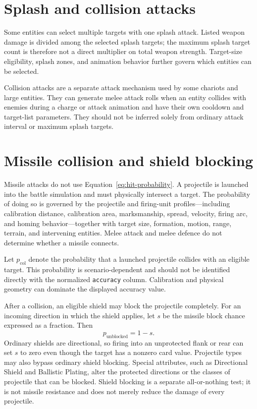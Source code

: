 \documentclass[11pt]{article}
\begin{document}
\section{Splash and collision attacks}

Some entities can select multiple targets with one splash attack.  Listed
weapon damage is divided among the selected splash targets; the maximum splash
target count is therefore not a direct multiplier on total weapon strength.
Target-size eligibility, splash zones, and animation behavior further govern
which entities can be selected.

Collision attacks are a separate attack mechanism used by some chariots and
large entities.  They can generate melee attack rolls when an entity collides
with enemies during a charge or attack animation and have their own cooldown
and target-list parameters.  They should not be inferred solely from ordinary
attack interval or maximum splash targets.

\section{Missile collision and shield blocking}

Missile attacks do not use Equation~\ref{eq:hit-probability}.  A projectile is
launched into the battle simulation and must physically intersect a target.
The probability of doing so is governed by the projectile and firing-unit
profiles---including calibration distance, calibration area, marksmanship,
spread, velocity, firing arc, and homing behavior---together with target size,
formation, motion, range, terrain, and intervening entities.  Melee attack and
melee defence do not determine whether a missile connects.

Let $p_{\mathrm{col}}$ denote the probability that a launched projectile
collides with an eligible target.  This probability is scenario-dependent and
should not be identified directly with the normalized \texttt{accuracy}
column.  Calibration and physical geometry can dominate the displayed
accuracy value.

After a collision, an eligible shield may block the projectile completely.
For an incoming direction in which the shield applies, let $s$ be the missile
block chance expressed as a fraction.  Then
\begin{equation}
  p_{\mathrm{unblocked}} = 1-s.
  \label{eq:missile-unblocked}
\end{equation}
Ordinary shields are directional, so firing into an unprotected flank or rear
can set $s$ to zero even though the target has a nonzero card value.  Projectile
types may also bypass ordinary shield blocking.  Special attributes, such as
Directional Shield and Ballistic Plating, alter the protected directions or
the classes of projectile that can be blocked.  Shield blocking is a separate
all-or-nothing test; it is not missile resistance and does not merely reduce
the damage of every projectile.
\end{document}
